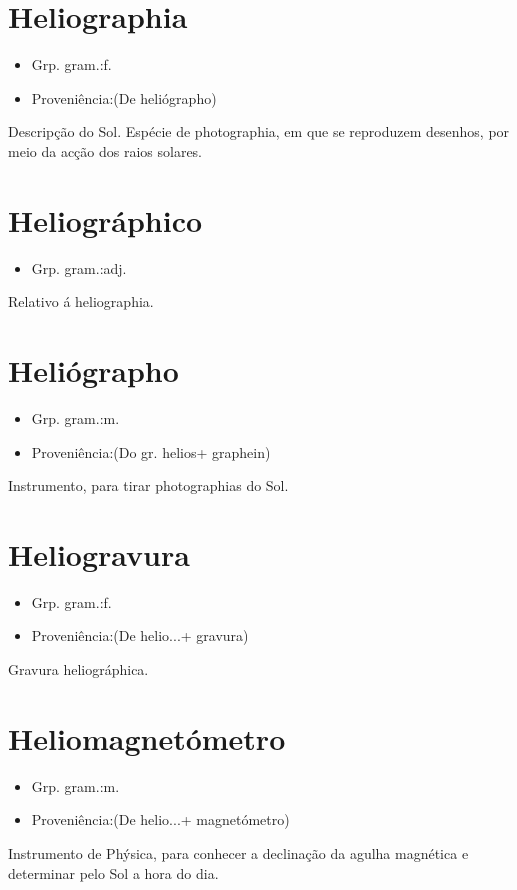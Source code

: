 \documentclass{article}
\begin{document}
\section{Heliographia}
\begin{itemize}
\item {Grp. gram.:f.}
\end{itemize}
\begin{itemize}
\item {Proveniência:(De \textunderscore heliógrapho\textunderscore )}
\end{itemize}
Descripção do Sol.
Espécie de photographia, em que se reproduzem desenhos, por meio da acção dos raios solares.
\section{Heliográphico}
\begin{itemize}
\item {Grp. gram.:adj.}
\end{itemize}
Relativo á heliographia.
\section{Heliógrapho}
\begin{itemize}
\item {Grp. gram.:m.}
\end{itemize}
\begin{itemize}
\item {Proveniência:(Do gr. \textunderscore helios\textunderscore  + \textunderscore graphein\textunderscore )}
\end{itemize}
Instrumento, para tirar photographias do Sol.
\section{Heliogravura}
\begin{itemize}
\item {Grp. gram.:f.}
\end{itemize}
\begin{itemize}
\item {Proveniência:(De \textunderscore helio...\textunderscore  + \textunderscore gravura\textunderscore )}
\end{itemize}
Gravura heliográphica.
\section{Heliomagnetómetro}
\begin{itemize}
\item {Grp. gram.:m.}
\end{itemize}
\begin{itemize}
\item {Proveniência:(De \textunderscore helio...\textunderscore  + \textunderscore magnetómetro\textunderscore )}
\end{itemize}
Instrumento de Phýsica, para conhecer a declinação da agulha magnética e determinar pelo Sol a hora do dia.
\end{document}
